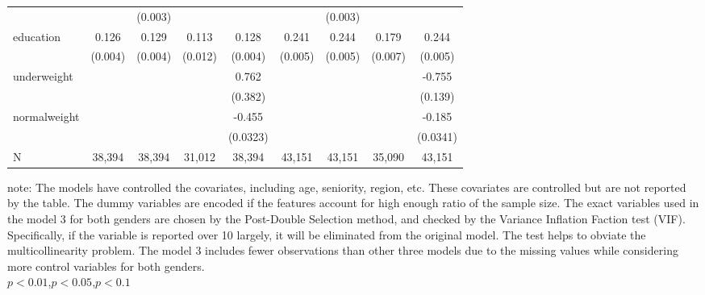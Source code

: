 \documentclass{article}
\begin{document}
\begin{center}
{{\begin{tabular}{lcccccccc}
& & (0.003) & &  && (0.003) && \\
education &0.126\textnormal{\superscript{***}} & 0.129\textnormal{\superscript{***}} & 0.113\textnormal{\superscript{***}} & 0.128\textnormal{\superscript{***}}& 0.241\textnormal{\superscript{***}} & 0.244\textnormal{\superscript{***}} & 0.179\textnormal{\superscript{***}} & 0.244\textnormal{\superscript{***}} \\
& (0.004)& (0.004) & (0.012) &(0.004)&(0.005) & (0.005) & (0.007) &(0.005)\\
underweight & & & & 0.762\textnormal{\superscript{**}} & & & & -0.755\textnormal{\superscript{***}} \\
& & & & (0.382) & & & & (0.139)\\
normalweight & & & & -0.455\textnormal{\superscript{***}} & & & & -0.185\textnormal{\superscript{***}} \\
& & & & (0.0323) & & & & (0.0341) \\
N & 38,394 & 38,394 & 31,012 & 38,394 & 43,151 & 43,151 & 35,090 & 43,151 \\
\end{tabular}}}
\end{center}
\vspace{-0.1cm}
\begin{footnotesize} note: The models have controlled the covariates, including age, seniority, region, etc. These covariates are controlled but are not reported by the table. The dummy variables are encoded if the features account for high enough ratio of the sample size. The exact variables used in the model 3 for both genders are chosen by the Post-Double Selection method, and checked by the Variance Inflation Faction test (VIF). Specifically, if the variable is reported over 10 largely, it will be eliminated from the original model. The test helps to obviate the multicollinearity problem. The model 3 includes fewer observations than other three models due to the missing values while considering more control variables for both genders. \\
\textnormal{\superscript{***}}$p<0.01$,\textnormal{\superscript{**}}$p<0.05$,\textnormal{\superscript{*}}$p<0.1$\normalsize
\end{footnotesize}
\end{document}
